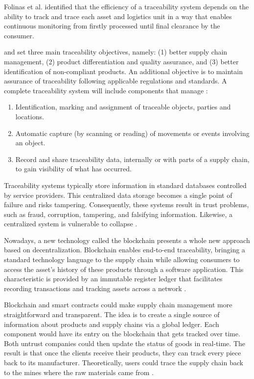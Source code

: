 Folinas et al. \cite{folinas2006traceability} identified that the efficiency of a traceability system depends on the ability to track and trace each asset and logistics unit in a way that enables continuous monitoring from firstly processed until final clearance by the consumer.

 and  set three main traceability objectives, namely: (1) better supply chain management, (2) product differentiation and quality assurance, and (3) better identification of non-compliant products. An additional objective is to maintain assurance of traceability following applicable regulations and standards. A complete traceability system will include components that manage \cite{vargas2017trazabilidad}:

\begin{enumerate}
\item Identification, marking and assignment of traceable objects, parties and locations.
\item Automatic capture (by scanning or reading) of movements or events involving an object.
\item Record and share traceability data, internally or with parts of a supply chain, to gain visibility of what has occurred.
\end{enumerate}

Traceability systems typically store information in standard databases controlled by service providers. This centralized data storage becomes a single point of failure and risks tampering. Consequently, these systems result in trust problems, such as fraud, corruption, tampering, and falsifying information. Likewise, a centralized system is vulnerable to collapse \cite{tian2017supply}.

Nowadays, a new technology called the blockchain presents a whole new approach based on decentralization. Blockchain enables end-to-end traceability, bringing a standard technology language to the supply chain while allowing consumers to access the asset's history of these products through a software application. This characteristic is provided by an immutable register ledger that facilitates recording transactions and tracking assets across a network \cite{galvez2018future}.



Blockchain and smart contracts could make supply chain management more straightforward and transparent. The idea is to create a single source of information about products and supply chains via a global ledger. Each component would have its entry on the blockchain that gets tracked over time. Both untrust companies could then update the status of goods in real-time. The result is that once the clients receive their products, they can track every piece back to its manufacturer. Theoretically, users could trace the supply chain back to the mines where the raw materials came from \cite{greve2018blockchain}.


